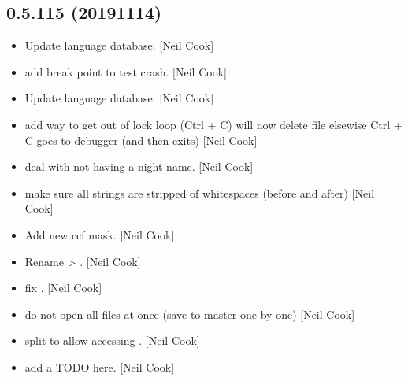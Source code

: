 \documentclass[a4paper,10pt,english]{report}
\begin{document}
\subsection{0.5.115 (2019\sphinxhyphen{}11\sphinxhyphen{}14)}
\label{\detokenize{misc/changelog:id46}}\begin{itemize}
\item {} 
Update language database. {[}Neil Cook{]}

\item {} 
 \sphinxhyphen{} add break point to test crash. {[}Neil
Cook{]}

\item {} 
Update language database. {[}Neil Cook{]}

\item {} 
 \sphinxhyphen{} add way to get out of lock loop (Ctrl + C) will now
delete file \sphinxhyphen{} elsewise Ctrl + C goes to debugger (and then exits)
{[}Neil Cook{]}

\item {} 
 \sphinxhyphen{} deal with not having a night name. {[}Neil
Cook{]}

\item {} 
 \sphinxhyphen{} make sure all strings are stripped of
whitespaces (before and after) {[}Neil Cook{]}

\item {} 
Add new ccf mask. {[}Neil Cook{]}

\item {} 
Rename  \textendash{}\textgreater{} . {[}Neil Cook{]}

\item {} 
 \sphinxhyphen{}fix . {[}Neil Cook{]}

\item {} 
 \sphinxhyphen{} do not open all files at once (save to master
one by one) {[}Neil Cook{]}

\item {} 
 \sphinxhyphen{} split  to allow accessing
. {[}Neil Cook{]}

\item {} 
 \sphinxhyphen{} add a TODO here. {[}Neil Cook{]}


\end{itemize}
\end{document}
